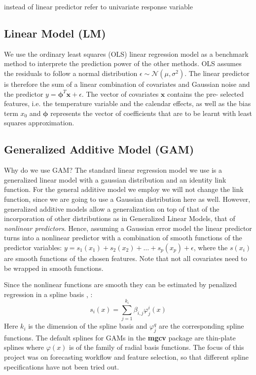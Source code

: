 \documentclass[conference]{IEEEtran}
\renewcommand{\vec}[1]{\mathbf{#1}}
\begin{document}
instead of linear predictor refer to univariate response variable

\subsection{Linear Model (LM)}
We use the ordinary least squares (OLS) linear regression model as a benchmark method to interprete the prediction power of the other methods. OLS assumes the residuals to follow a normal distribution $\epsilon \sim \mathcal{N}(\mu, \sigma^2)$. The linear predictor is therefore the sum of a linear combination of covariates and Gaussian noise  and the predictor $y = \vec{\phi}^T \vec{x} + \epsilon$. The vector of covariates $\vec{x}$ contains the pre- selected features, i.e. the temperature variable and the calendar effects, as well as the bias term $x_0$ and $\vec{\phi}$ represents the vector of coefficients that are to be learnt with least squares approximation.

\subsection{Generalized Additive Model (GAM)}
Why do we use GAM?
The standard linear regression model we use is a generalized linear model with a gaussian distribution and an identity link function. For the general additive model \cite{Wood2006} we employ we will not change the link function, since we are going to use a Gaussian distribution here as well. However, generalized additive models allow a generalization on top of that of the incorporation of other distributions as in Generalized Linear Models, that of \emph{nonlinear predictors}. Hence, assuming a Gaussian error model the linear predictor turns into a nonlinear predictor with a combination of smooth functions of the predictor variables: $y=s_1(x_1)+s_2(x_2)+\dots+s_p(x_p)+\epsilon$, where the $s(x_i)$ are smooth functions of the chosen features. Note that not all covariates need to be wrapped in smooth functions.\par
Since the nonlinear functions are smooth they can be estimated by penalized regression in a spline basis \cite{Nedellec2014}, \cite{GAMS}:
\[
  s_i(x)=\sum_{j=1}^{k_i}\beta_{i,j}\varphi_j^i(x)
\]
Here $k_i$ is the dimension of the spline basis and $\varphi_j^q$ are the corresponding spline functions. The default splines for GAMs in the \textbf{mgcv} package are thin-plate splines \cite{Wood2003} where $\varphi(x)$ is of the family of radial basis functions. The focus of this project was on forecasting workflow and feature selection, so that different spline specifications have not been tried out.\par
\end{document}
